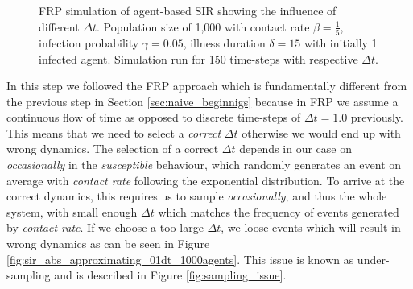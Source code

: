 \begin{figure}
\begin{center}
	\caption{FRP simulation of agent-based SIR showing the influence of different $\Delta t$. Population size of 1,000 with contact rate $\beta = \frac{1}{5}$, infection probability $\gamma = 0.05$, illness duration $\delta = 15$ with initially 1 infected agent. Simulation run for 150 time-steps with respective $\Delta t$.} 
	\label{fig:sir_abs_dynamics_frp}
\end{center}
\end{figure}

In this step we followed the FRP approach which is fundamentally different from the previous step in Section \ref{sec:naive_beginnigs} because in FRP we assume a continuous flow of time as opposed to discrete time-steps of $\Delta t = 1.0$ previously. This means that we need to select a \textit{correct} $\Delta t$ otherwise we would end up with wrong dynamics. The selection of a correct $\Delta t$ depends in our case on \textit{occasionally} in the \textit{susceptible} behaviour, which randomly generates an event on average with \textit{contact rate} following the exponential distribution. To arrive at the correct dynamics, this requires us to sample \textit{occasionally}, and thus the whole system, with small enough $\Delta t$ which matches the frequency of events generated by \textit{contact rate}. If we choose a too large $\Delta t$, we loose events which will result in wrong dynamics as can be seen in Figure \ref{fig:sir_abs_approximating_01dt_1000agents}. This issue is known as under-sampling and is described in Figure \ref{fig:sampling_issue}.


